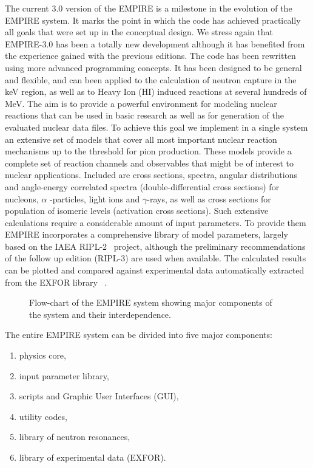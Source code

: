 The current 3.0 version of the EMPIRE is a milestone in the evolution of the
EMPIRE system. It marks the point in which the code has achieved practically
all goals that were set up in the conceptual design. We stress again that
EMPIRE-3.0 has been a totally new development although it has benefited from
the experience gained with the previous editions. The code has been
rewritten using more advanced programming concepts. It has been designed to
be general and flexible, and can been applied to the calculation of neutron
capture in the keV region, as well as to Heavy Ion (HI) induced reactions at
several hundreds of MeV. The aim is to provide a powerful environment for
modeling nuclear reactions that can be used in basic research as well as for
generation of the evaluated nuclear data files. To achieve this goal we
implement in a single system an extensive set of models that cover all most
important nuclear reaction mechanisms up to the threshold for pion
production. These models provide a complete set of reaction channels and
observables that might be of interest to nuclear applications. Included are
cross sections, spectra, angular distributions and angle-energy correlated
spectra (double-differential cross sections) for nucleons, $\alpha $%
-particles, light ions and $\gamma $-rays, as well as cross sections for
population of isomeric levels (activation cross sections). Such extensive
calculations require a considerable amount of input parameters. To provide
them EMPIRE incorporates a comprehensive library of model parameters,
largely based on the IAEA RIPL-2~\cite{RIPL2} project, although the
preliminary recommendations of the follow up edition (RIPL-3) are used when
available. The calculated results can be plotted and compared against
experimental data automatically extracted from the EXFOR library~\cite{EXFOR}%
.

\begin{figure*}[htbp]
\caption{Flow-chart of the EMPIRE system showing major components of the
system and their interdependence.}
\label{fig:empire-flowchart}
\end{figure*}

The entire EMPIRE system can be divided into five major components:

\begin{enumerate}
\item physics core,

\item input parameter library,

\item scripts and Graphic User Interfaces (GUI),

\item utility codes,

\item library of neutron resonances,

\item library of experimental data (EXFOR).
\end{enumerate}

